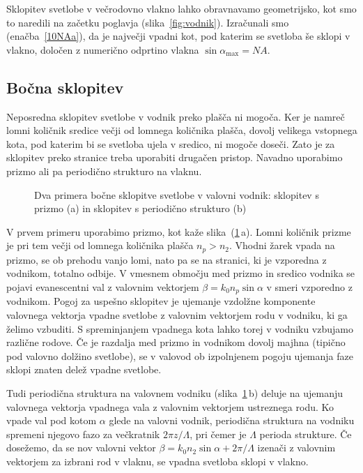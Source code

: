 \begin{remark}
Sklopitev svetlobe v večrodovno vlakno lahko obravnavamo geometrijsko, kot smo to naredili
na začetku poglavja (slika~\ref{fig:vodnik}). Izračunali smo (enačba~\ref{10NAa}), da je največji 
vpadni kot, pod katerim se svetloba še sklopi v vlakno, določen z numerično odprtino 
vlakna $\sin \alpha_{\mathrm{max}}= NA$.
\end{remark}

\subsection*{Bočna sklopitev}
Neposredna sklopitev svetlobe v vodnik preko plašča ni mogoča. Ker je namreč lomni količnik
sredice večji od lomnega količnika plašča, dovolj velikega vstopnega kota, pod katerim bi 
se svetloba ujela v sredico, ni mogoče doseči. Zato je za sklopitev preko stranice treba 
uporabiti drugačen pristop. Navadno uporabimo prizmo ali pa periodično strukturo na vlaknu. 

\begin{figure}[h]
\centering
\def\svgwidth{120truemm} 
 
\caption{Dva primera bočne sklopitve svetlobe v valovni vodnik: sklopitev s prizmo (a) in sklopitev
s periodično strukturo (b)}
\label{fig:coupler}
\end{figure}
V prvem primeru uporabimo prizmo, kot kaže slika~(\ref{fig:coupler}\,a). Lomni količnik prizme
je pri tem večji od lomnega količnika plašča $n_p > n_2$.
Vhodni žarek vpada na prizmo, se ob prehodu vanjo lomi, nato pa se na stranici, ki je vzporedna
z vodnikom, totalno odbije. 
V vmesnem območju med prizmo in sredico vodnika se pojavi evanescentni
val z valovnim vektorjem $\beta  = k_0 n_p \sin \alpha$ v smeri vzporedno z vodnikom. Pogoj za uspešno 
sklopitev je ujemanje vzdolžne komponente valovnega vektorja vpadne svetlobe z valovnim 
vektorjem rodu v vodniku, ki ga želimo vzbuditi. 
S spreminjanjem vpadnega kota lahko torej v vodniku vzbujamo različne rodove. 
Če je razdalja med prizmo in vodnikom dovolj majhna (tipično pod valovno dolžino svetlobe), se v 
valovod ob izpolnjenem pogoju ujemanja faze sklopi znaten delež vpadne svetlobe.

Tudi periodična struktura na valovnem vodniku (slika~\ref{fig:coupler}\,b) deluje na 
ujemanju valovnega vektorja vpadnega vala z valovnim vektorjem ustreznega rodu.
Ko vpade val pod kotom $\alpha$ glede na valovni vodnik, periodična struktura na vodniku 
spremeni njegovo fazo za večkratnik $2 \pi z/\Lambda$, pri čemer je $\Lambda$ perioda strukture.
Če dosežemo, da se nov valovni vektor $\beta = k_0 n_2 \sin \alpha+ 2 \pi/\Lambda$ izenači z valovnim 
vektorjem za izbrani rod v vlaknu, se vpadna svetloba sklopi v vlakno.

